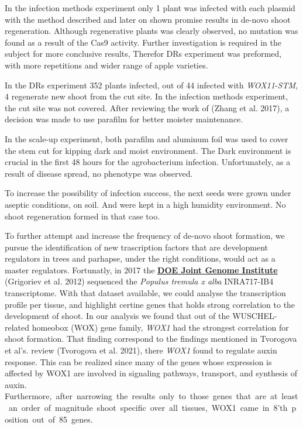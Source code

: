 \documentclass[
]{article}
\begin{document}
In the infection methods experiment only 1 plant was infected with each
plasmid with the method described and later on shown promise results in
de-novo shoot regeneration. Although regenerative plants was clearly
observed, no mutation was found as a result of the Cas9 activity.
Further investigation is required in the subject for more conclusive
results, Therefor DRs experiment was preformed, with more repetitions
and wider range of apple varieties.

In the DRs experiment 352 plants infected, out of 44 infected with
\emph{WOX11}-\emph{STM}, 4 regenerate new shoot from the cut site. In
the infection methods experiment, the cut site was not covered. After
reviewing the work of (Zhang et al. 2017), a decision was made to use
parafilm for better moister maintenance.

In the scale-up experiment, both parafilm and aluminum foil was used to
cover the stem cut for kipping dark and moist environment. The Dark
environment is crucial in the first 48 hours for the agrobacterium
infection. Unfortunately, as a result of disease spread, no phenotype
was observed.

To increase the possibility of infection success, the next seeds were
grown under aseptic conditions, on soil. And were kept in a high
humidity environment. No shoot regeneration formed in that case too.

To further attempt and increase the frequency of de-novo shoot
formation, we pursue the identification of new trascription factors that
are development regulators in trees and parhapse, under the right
conditions, would act as a master regulators. Fortunatly, in 2017 the
\href{https://genome.jgi.doe.gov/portal/PoptreSequencing_FD/PoptreSequencing_FD.info.html}{\textbf{DOE
Joint Genome Institute}} (Grigoriev et al. 2012) sequenced the
\emph{Populus tremula x alba} INRA717-IB4 transcriptome. With that
dataset available, we could analyse the transcription profile per
tissue, and highlight certine genes that holds strong correlation to the
development of shoot. In our analysis we found that out of the
WUSCHEL-related homeobox (WOX) gene family, \emph{WOX1} had the
strongest correlation for shoot formation. That finding correspond to
the findings mentioned in Tvorogova et al's. review (Tvorogova et al.
2021), there \emph{WOX1} found to regulate auxin response. This can be
realized since many of the genes whose expression is affected by WOX1
are involved in signaling pathways, transport, and synthesis of auxin.
Furthermore,~after~narrowing~the~results~only~to~those~genes~that~are~at~least~an~order~of~magnitude~shoot~specific~over~all~tissues,~WOX1~came~in~8'th~position~out~of~85~genes.
\end{document}
